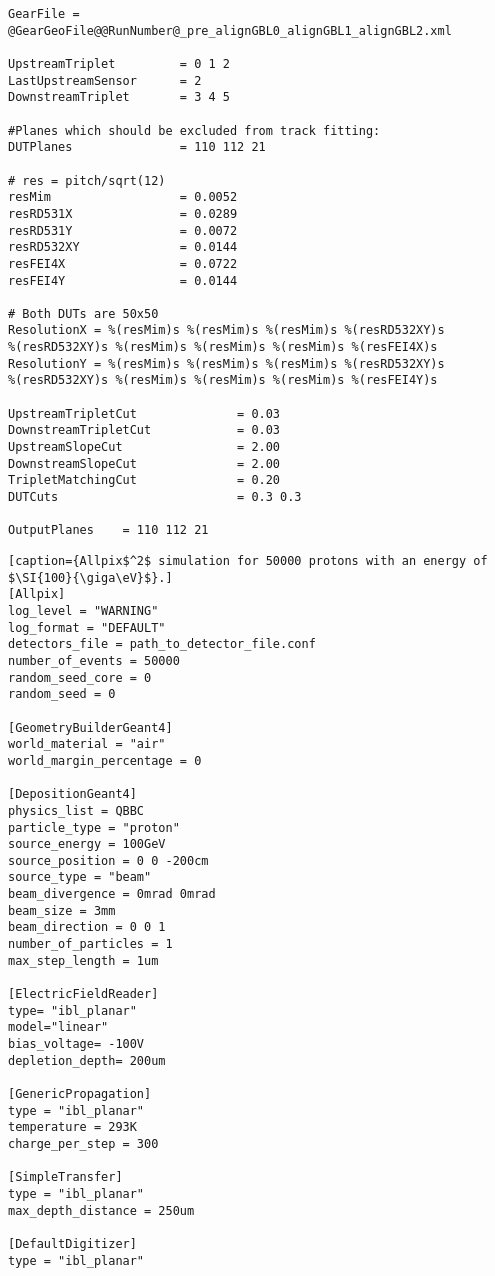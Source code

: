 \begin{lstlisting}[caption={Configuration file of EUTelescope for the data taken at the DESY testbeam facility in June 2020.}]
GearFile = @GearGeoFile@@RunNumber@_pre_alignGBL0_alignGBL1_alignGBL2.xml

UpstreamTriplet         = 0 1 2
LastUpstreamSensor      = 2
DownstreamTriplet       = 3 4 5

#Planes which should be excluded from track fitting:
DUTPlanes               = 110 112 21

# res = pitch/sqrt(12)
resMim                  = 0.0052
resRD531X               = 0.0289
resRD531Y               = 0.0072
resRD532XY              = 0.0144
resFEI4X                = 0.0722
resFEI4Y                = 0.0144

# Both DUTs are 50x50
ResolutionX = %(resMim)s %(resMim)s %(resMim)s %(resRD532XY)s
%(resRD532XY)s %(resMim)s %(resMim)s %(resMim)s %(resFEI4X)s
ResolutionY = %(resMim)s %(resMim)s %(resMim)s %(resRD532XY)s
%(resRD532XY)s %(resMim)s %(resMim)s %(resMim)s %(resFEI4Y)s

UpstreamTripletCut              = 0.03
DownstreamTripletCut            = 0.03
UpstreamSlopeCut                = 2.00
DownstreamSlopeCut              = 2.00
TripletMatchingCut              = 0.20
DUTCuts                         = 0.3 0.3

OutputPlanes    = 110 112 21
\end{lstlisting}

\clearpage

\begin{lstlisting}[caption={Allpix$^2$ simulation for 50000 protons with an energy of $\SI{100}{\giga\eV}$}.]
[Allpix]
log_level = "WARNING"
log_format = "DEFAULT"
detectors_file = path_to_detector_file.conf
number_of_events = 50000
random_seed_core = 0
random_seed = 0

[GeometryBuilderGeant4]
world_material = "air"
world_margin_percentage = 0

[DepositionGeant4]
physics_list = QBBC
particle_type = "proton"
source_energy = 100GeV
source_position = 0 0 -200cm
source_type = "beam"
beam_divergence = 0mrad 0mrad
beam_size = 3mm
beam_direction = 0 0 1
number_of_particles = 1
max_step_length = 1um

[ElectricFieldReader]
type= "ibl_planar"
model="linear"
bias_voltage= -100V
depletion_depth= 200um

[GenericPropagation]
type = "ibl_planar"
temperature = 293K
charge_per_step = 300

[SimpleTransfer]
type = "ibl_planar"
max_depth_distance = 250um

[DefaultDigitizer]
type = "ibl_planar"
\end{lstlisting}

